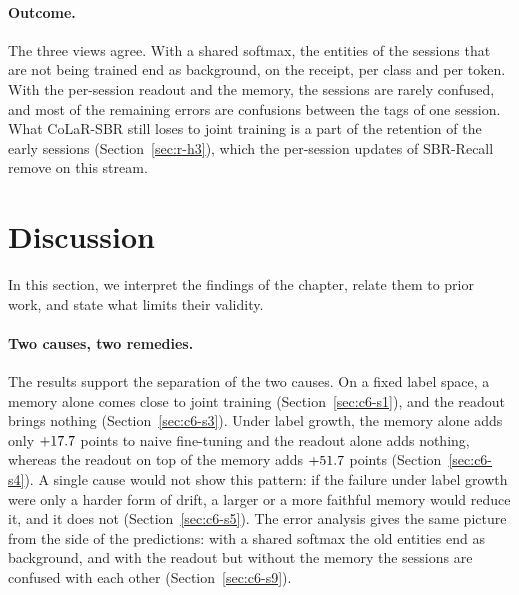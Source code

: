 \begin{table}[!htbp]
  \centering
  \caption[Where the entities of the old sessions go]{\textbf{Where the entities of the
  old sessions go} (CIL-CORD, final model, sessions~1 to~4; range over the runs, in
  percent). Relab.$^{r}$: older stored documents relabelled with the ground-truth labels;
  No mem.: blocked readout without a memory. R, P: recall and precision of the old spans
  (P is an upper bound under the shared softmax). O$^{i}$: share of the missed spans that
  are predicted entirely as ``O''. Owner: share of the old entity tokens claimed by their
  own block; $\to$O, $\to$same, $\to$other: where the wrong tokens go; false: share of the
  other tokens that an old block claims.}
  \label{tab:mech}
  \small
\end{table}

\paragraph{Outcome.} The three views agree. With a shared softmax, the entities of the
sessions that are not being trained end as background, on the receipt, per class and per
token. With the per-session readout and the memory, the sessions are rarely confused, and
most of the remaining errors are confusions between the tags of one session. What
CoLaR-SBR still loses to joint training is a part of the retention of the early sessions
(Section~\ref{sec:r-h3}), which the per-session updates of SBR-Recall remove on this
stream.

\section{Discussion}
\label{sec:c6-s10}

In this section, we interpret the findings of the chapter, relate them to prior work, and
state what limits their validity.

\paragraph{Two causes, two remedies.} The results support the separation of the two causes.
On a fixed label space, a memory alone comes close to joint training
(Section~\ref{sec:c6-s1}), and the readout brings nothing (Section~\ref{sec:c6-s3}). Under
label growth, the memory alone adds only $+17.7$ points to naive fine-tuning and the
readout alone adds nothing, whereas the readout on top of the memory adds
$+51.7$ points (Section~\ref{sec:c6-s4}). A single cause would not show this
pattern: if the failure under label growth were only a harder form of drift, a larger or a
more faithful memory would reduce it, and it does not (Section~\ref{sec:c6-s5}). The error
analysis gives the same picture from the side of the predictions: with a shared softmax the
old entities end as background, and with the readout but without the memory the sessions
are confused with each other (Section~\ref{sec:c6-s9}).

